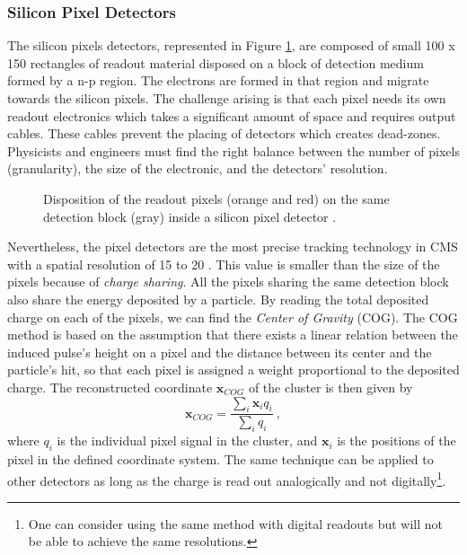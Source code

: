   \subsubsection{Silicon Pixel Detectors}
  \label{sec:lhc_and_cms__silicon_pixel_detectors}

    The silicon pixels detectors, represented in Figure \ref{fig:lhc_and_cms__cms_pixel_detector}, are composed of small 100 \um{} x 150 \um{} rectangles of readout material disposed on a block of detection medium formed by a n-p region. The electrons are formed in that region and migrate towards the silicon pixels. The challenge arising is that each pixel needs its own readout electronics which takes a significant amount of space and requires output cables. These cables prevent the placing of detectors which creates dead-zones. Physicists and engineers must find the right balance between the number of pixels (granularity), the size of the electronic, and the detectors' resolution. \\

    \begin{figure}[h!]
      \centering
      \caption{Disposition of the readout pixels (orange and red) on the same detection block (gray) inside a silicon pixel detector \Cite{CMS_Tracker_Construction}.}
      \label{fig:lhc_and_cms__cms_pixel_detector}
    \end{figure}

    Nevertheless, the pixel detectors are the most precise tracking technology in CMS with a spatial resolution of 15 to 20 \um{}. This value is smaller than the size of the pixels because of \emph{charge sharing}. All the pixels sharing the same detection block also share the energy deposited by a particle. By reading the total deposited charge on each of the pixels, we can find the \emph{Center of Gravity} (COG). The COG method is based on the assumption that there exists a linear relation between the induced pulse's height on a pixel and the distance between its center and the particle's hit, so that each pixel is assigned a weight proportional to the deposited charge. The reconstructed coordinate $ \mathbf{x}_{COG} $ of the cluster is then given by
    \begin{equation}
      \mathbf{x}_{COG} = \frac{\sum_i \mathbf{x}_i q_i}{\sum_i q_i} \ ,
      \label{eq:lhc_and_cms__charge_sharing}
    \end{equation}
    where $ q_i $ is the individual pixel signal in the cluster, and $ \mathbf{x}_i $ is the positions of the pixel in the defined coordinate system. The same technique can be applied to other detectors as long as the charge is read out analogically and not digitally\footnote{One can consider using the same method with digital readouts but will not be able to achieve the same resolutions.}.

